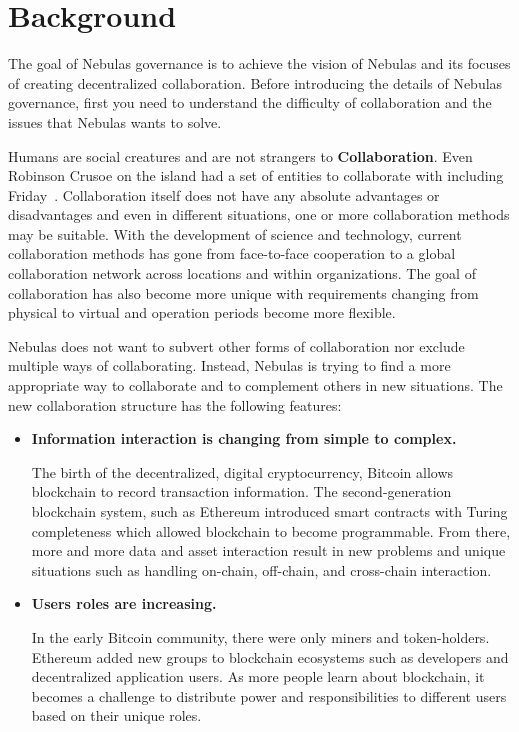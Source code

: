 \section{Background}

The goal of Nebulas governance is to achieve the vision of Nebulas and its focuses of creating decentralized collaboration. Before introducing the details of Nebulas governance, first you need to understand the difficulty of collaboration and the issues that Nebulas wants to solve.

\label{background}

Humans are social creatures and are not strangers to \textbf{Collaboration}. Even Robinson Crusoe on the island had a set of entities to collaborate with including Friday~\cite{robinson}. Collaboration itself does not have any absolute advantages or disadvantages and even in different situations, one or more collaboration methods may be suitable. With the development of science and technology, current collaboration methods has gone from face-to-face cooperation to a global collaboration network across locations and within organizations. The goal of collaboration has also become more unique with requirements changing from physical to virtual and operation periods become more flexible.

Nebulas does not want to subvert other forms of collaboration nor exclude multiple ways of collaborating. Instead, Nebulas is trying to find a more appropriate way to collaborate and to complement others in new situations. The new collaboration structure has the following features:

\begin{itemize}
	\item \textbf{Information interaction is changing from simple to complex.}

	The birth of the decentralized, digital cryptocurrency, Bitcoin allows blockchain to record transaction information. The second-generation blockchain system, such as Ethereum introduced smart contracts with Turing completeness which allowed blockchain to become programmable. From there, more and more data and asset interaction result in new problems and unique situations such as handling on-chain, off-chain, and cross-chain interaction.

	\item \textbf{Users roles are increasing.}

	In the early Bitcoin community, there were only miners and token-holders. Ethereum added new groups to blockchain ecosystems such as developers and decentralized application users. As more people learn about blockchain, it becomes a challenge to distribute power and responsibilities to different users based on their unique roles.

\end{itemize}

